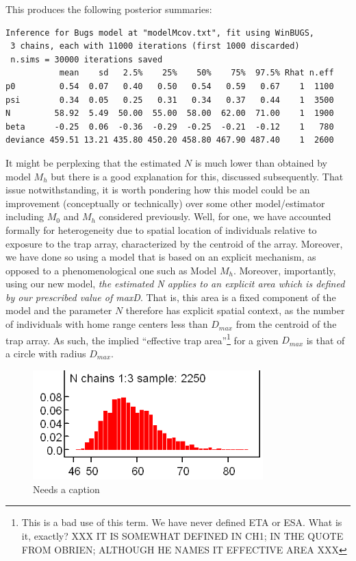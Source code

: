 This produces the following posterior summaries:
{\small
\begin{verbatim}
Inference for Bugs model at "modelMcov.txt", fit using WinBUGS,
 3 chains, each with 11000 iterations (first 1000 discarded)
 n.sims = 30000 iterations saved
           mean    sd   2.5%    25%    50%    75%  97.5% Rhat n.eff
p0         0.54  0.07   0.40   0.50   0.54   0.59   0.67    1  1100
psi        0.34  0.05   0.25   0.31   0.34   0.37   0.44    1  3500
N         58.92  5.49  50.00  55.00  58.00  62.00  71.00    1  1900
beta      -0.25  0.06  -0.36  -0.29  -0.25  -0.21  -0.12    1   780
deviance 459.51 13.21 435.80 450.20 458.80 467.90 487.40    1  2600
\end{verbatim}
}


It might be 
perplexing that the estimated $N$ is much lower than obtained by model
$M_h$ but there is a good explanation for this, discussed
subsequently. That issue notwithstanding, it is worth pondering how
this model could be an improvement (conceptually or technically) over
some other model/estimator including $M_0$ and $M_h$ considered
previously. Well, for one, we have accounted formally for
heterogeneity due to spatial location of individuals relative to
exposure to the trap array, characterized by the centroid of the
array. Moreover, we have done so using a model that is based on an
explicit mechanism, as opposed to a phenomenological one such as Model
$M_h$. Moreover, importantly, using our new model, {\it the estimated N
  applies to an explicit area which is defined by our prescribed value
  of maxD}. That is, this area is a fixed component of the model and
the parameter $N$ therefore has explicit spatial context, as the number
of individuals with home range centers less than $D_{max}$ from the
centroid of the trap array. As such, the implied ``effective trap
area''\footnote{This is a bad use of this term. We have never defined
  ETA or ESA. What is it, exactly? XXX IT IS SOMEWHAT DEFINED IN CH1; IN THE QUOTE FROM OBRIEN; ALTHOUGH HE NAMES IT EFFECTIVE AREA XXX} for a given $D_{max}$ is that of a circle
with radius $D_{max}$.



\begin{figure}
\begin{center}
\includegraphics[width=3.5in]{Ch3/figs/Nchains}
\end{center}
\caption{Needs a caption}
\label{closed.fig.ha}
\end{figure}

